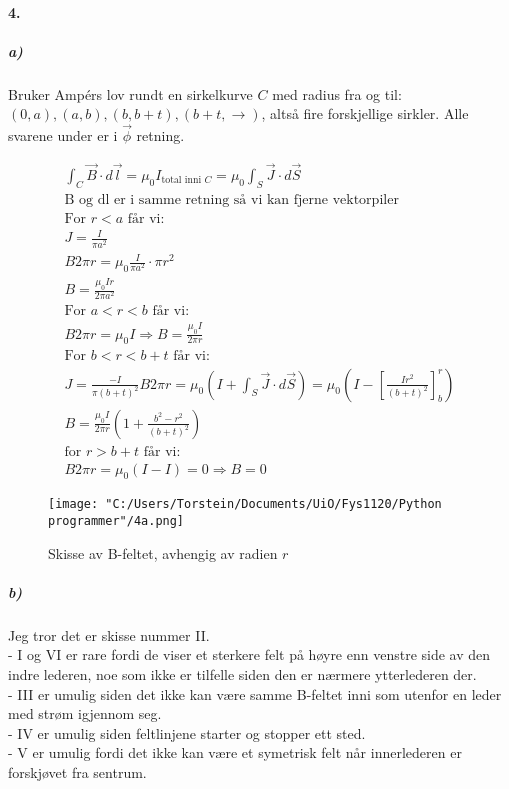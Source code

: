 \documentclass[11pt, A4paper,norsk]{article}
\begin{document}
		\paragraph{4.}
			\subparagraph{a)}
				\begin{flushleft}
Bruker Ampérs lov rundt en sirkelkurve $C$ med radius fra og til: $(0, a), (a, b), (b, b + t), (b + t, \rightarrow)$, altså fire forskjellige sirkler. Alle svarene under er i $\vec{\phi}$ retning.
				\end{flushleft}
				\begin{align}
\int_C \vec{B} \cdot d\vec{l} = \mu_0 I_{\text{total inni $C$}} = \mu_0 \int_S \vec{J} \cdot d\vec{S} \\
\text{B og dl er i samme retning så vi kan fjerne vektorpiler} \nonumber \\
\text{For $r < a$ får vi:} \nonumber \\
J = \frac{I}{\pi a^2} \\
B 2 \pi r = \mu_0 \frac{I}{\pi a^2} \cdot \pi r^2 \\
B = \frac{\mu_0 I r}{2 \pi a^2} \\
\text{For $a < r < b$ får vi:} \nonumber \\
B 2 \pi r = \mu_0 I \Rightarrow B = \frac{\mu_0 I}{2 \pi r} \\
\text{For $b < r < b + t$ får vi:} \nonumber \\
J = \frac{-I}{\pi (b + t)^2}
B 2 \pi r = \mu_0(I + \int_S \vec{J} \cdot d\vec{S}) = \mu_0(I - \left[ \frac{Ir^2}{(b + t)^2} \right]_{b}^{r}) \\
B = \frac{\mu_0 I}{2 \pi r} \left(1 + \frac{b^2 - r^2}{(b + t)^2} \right) \\
\text{for $r > b + t$ får vi:} \nonumber \\
B 2 \pi r = \mu_0 (I - I) = 0 \Rightarrow B = 0
				\end{align}
				\begin{figure}
\texttt{[image: "C:/Users/Torstein/Documents/UiO/Fys1120/Python programmer"/4a.png]}
\caption{Skisse av B-feltet, avhengig av radien $r$}
				\end{figure}
\clearpage









			\subparagraph{b)}
				\begin{flushleft}
Jeg tror det er skisse nummer II. \\
- I og VI er rare fordi de viser et sterkere felt på høyre enn venstre side av den indre lederen, noe som ikke er tilfelle siden den er nærmere ytterlederen der. \\
- III er umulig siden det ikke kan være samme B-feltet inni som utenfor en leder med strøm igjennom seg. \\
- IV er umulig siden feltlinjene starter og stopper ett sted. \\
- V er umulig fordi det ikke kan være et symetrisk felt når innerlederen er forskjøvet fra sentrum.
				\end{flushleft}
\end{document}
